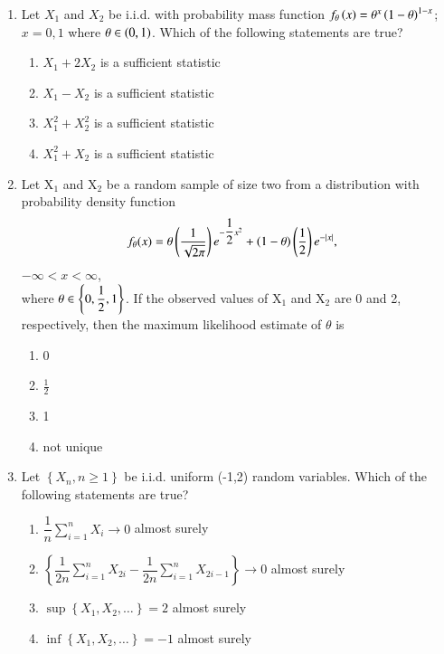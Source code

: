 \begin{enumerate}[label=\thesection.\arabic*.,ref=\thesection.\theenumi]
%
\item Let $X_1$ and $X_2$ be i.i.d. with probability mass function $f_{\theta}\left(x\right) = \theta^x \left(1-\theta\right)^{1-x}$; $x=0,1$ where $\theta \in \left(0,1\right)$. Which of the following statements are true?
\begin{enumerate}
    \item $X_1 + 2X_2 $ is a sufficient statistic
    \item $X_1 - X_2 $ is a sufficient statistic
    \item $X_1^2 + X_2^2 $ is a sufficient statistic
    \item $X_1^2 + X_2 $ is a sufficient statistic
\end{enumerate}
%
\solution

%
%
\item Let X$_{1}$ and X$_{2}$ be a random sample of size two
from a distribution with probability density
function
\begin{align}
    f_{\theta}(x) &= \theta \left(\dfrac{1}{\sqrt{2\pi}}\right)e^{-\dfrac{1}{2} x^{2}} + \left(1-\theta\right)\left(\dfrac{1}{2}\right)e^{-\mid x\mid} \nonumber,
\end{align}
$-\infty<x<\infty$,\\
where  $\theta \in \left\{ 0,\dfrac{1}{2}, 1 \right\}$. If the observed values
of X$_{1}$ and X$_{2}$ are 0 and 2, respectively, then
the maximum likelihood estimate of $\theta$ is
\begin{enumerate}
    \item 0 
    \item $\frac{1}{2}$
    \item 1
    \item not unique
\end{enumerate}
%
\solution

%
%
\item Let $\left\{X_{n}, n \geq 1\right\}$ be i.i.d. uniform (-1,2) random variables. Which of the following statements are true?
\begin{enumerate}[label=\alph*)]
\item $\dfrac{1}{n} \sum_{i=1}^{n} X_{i} \rightarrow 0$ almost surely
\item $\left\{\dfrac{1}{2 n} \sum_{i=1}^{n} X_{2 i}-\dfrac{1}{2 n} \sum_{i=1}^{n} X_{2 i-1}\right\}\rightarrow 0$
almost surely
\item $\sup \left\{X_{1}, X_{2}, \ldots\right\}=2$ almost surely
\item $\inf \left\{X_{1}, X_{2}, \ldots\right\}=-1$ almost surely
\end{enumerate}

\end{enumerate}
